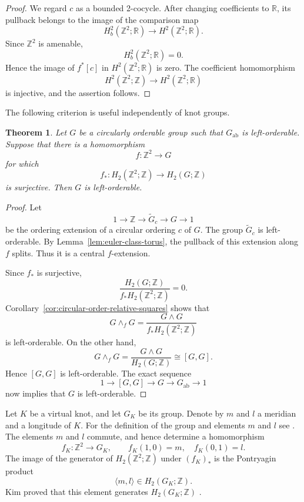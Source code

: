 \documentclass[10pt]{amsart}
\newtheorem{theorem}{Theorem}[section]
\renewcommand{\*}{\cdot {\dots} \cdot}
\newcommand{\?}[1]{\overset{?}{#1}}
\numberwithin{equation}{section}
\begin{document}
\begin{proof}
We regard $ c $ as a bounded 2-cocycle. After changing coefficients to $\mathbb R$,
its pullback belongs to the image of the comparison map
\[
H_b^2(\mathbb Z^2;\mathbb R)
\longrightarrow
H^2(\mathbb Z^2;\mathbb R).
\]
Since $\mathbb Z^2$ is amenable,
\[
H_b^2(\mathbb Z^2;\mathbb R)=0.
\] Hence the image of $f^*[c]$ in
$H^2(\mathbb Z^2;\mathbb R)$ is zero. The coefficient
homomorphism
\[
H^2(\mathbb Z^2;\mathbb Z)
\longrightarrow
H^2(\mathbb Z^2;\mathbb R)
\]
is injective, and the assertion follows.
\end{proof}

The following criterion is useful independently of knot
groups.

\begin{theorem}\label{thm:torus-orderability-criterion}
Let $G$ be a circularly orderable group such that $G_{\mathrm{ab}}$
is left-orderable. Suppose that there is a homomorphism
\[
f\colon\mathbb Z^2\longrightarrow G
\]
for which
\[
f_*\colon H_2(\mathbb Z^2;\mathbb Z)
\longrightarrow H_2(G;\mathbb Z)
\]
is surjective. Then $G$ is left-orderable.
\end{theorem}

\begin{proof}
Let
\[
1\longrightarrow\mathbb Z
\longrightarrow\widetilde G_c
\longrightarrow G
\longrightarrow1
\]
be the ordering extension of a circular ordering $c$ of $G$.
The group $\widetilde G_c$ is left-orderable. By
Lemma~\ref{lem:euler-class-torus}, the pullback of this
extension along $f$ splits. Thus it is a central $f$-extension.

Since $f_*$ is surjective,
\[
\frac{H_2(G;\mathbb Z)}
     {f_*H_2(\mathbb Z^2;\mathbb Z)}
=0.
\]
Corollary~\ref{cor:circular-order-relative-squares} shows that
\[
G\wedge_f G
=
\frac{G\wedge G}
     {f_*H_2(\mathbb Z^2;\mathbb Z)}
\]
is left-orderable. On the other hand,
\[
G\wedge_fG
=
\frac{G\wedge G}{H_2(G;\mathbb Z)}
\cong [G,G].
\]
Hence $[G,G]$ is left-orderable. The exact sequence
\[
1\longrightarrow [G,G]
\longrightarrow G
\longrightarrow G_{\mathrm{ab}}
\longrightarrow1
\]
now implies that $G$ is left-orderable.
\end{proof}

Let $K$ be a virtual knot, and let $G_K$ be its group. Denote
by $m$ and $l$ a meridian and a longitude of $K$. For the definition of the group and elements $m$ and $l$ see \cite{Kim2000}. The elements
$m$ and $l$ commute, and hence determine a homomorphism
\[
f_K\colon\mathbb Z^2\longrightarrow G_K,
\qquad
f_K(1,0)=m,
\quad
f_K(0,1)=l.
\]
The image of the generator of
$H_2(\mathbb Z^2;\mathbb Z)$ under $(f_K)_*$ is the
Pontryagin product
\[
\langle m,l\rangle\in H_2(G_K;\mathbb Z).
\]
Kim proved that this element generates $H_2(G_K;\mathbb Z)$
\cite[Theorem~16]{Kim2000}.
\end{document}
